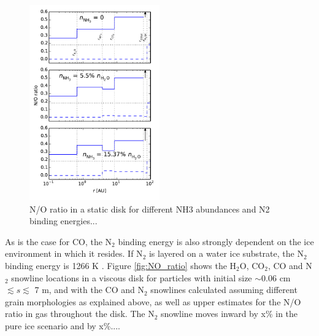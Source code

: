 \documentclass[apj]{emulateapj}
\begin{document}
\begin{figure}[h!]
\centering
\includegraphics[width=0.5\textwidth]{../../figs/N_O_ratio.pdf}
\caption{N/O ratio in a static disk for different NH3 abundances and N2 binding energies...} 
\label{fig:Nstatic}
\end{figure}


As is the case for CO, the N$_2$ binding energy is also strongly dependent on the ice environment in which it resides. If N$_2$ is layered on a water ice substrate, the N$_2$ binding energy is 1266 K \citep{fayolle16}. Figure \ref{fig:NO_ratio} shows the H$_2$O, CO$_2$, CO and N$_2$ snowline locations in a viscous disk for particles with initial size $\sim0.06$ cm $\lesssim s \lesssim$ 7 m, and with the CO and N$_2$ snowlines calculated assuming different grain morphologies as explained above, as well as upper estimates for the N/O ratio in gas throughout the disk. The N$_2$ snowline moves inward by x\% in the pure ice scenario and by x\%.... 
\end{document}
